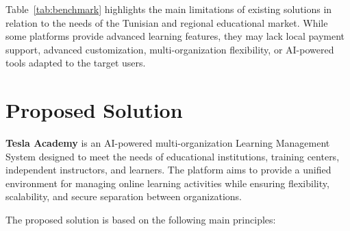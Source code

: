 Table~\ref{tab:benchmark} highlights the main limitations of existing solutions in relation
to the needs of the Tunisian and regional educational market. While some platforms provide
advanced learning features, they may lack local payment support, advanced customization,
multi-organization flexibility, or AI-powered tools adapted to the target users.

\section{Proposed Solution}

\textbf{Tesla Academy} is an AI-powered multi-organization Learning Management System
designed to meet the needs of educational institutions, training centers, independent
instructors, and learners. The platform aims to provide a unified environment for managing
online learning activities while ensuring flexibility, scalability, and secure separation
between organizations.

The proposed solution is based on the following main principles:

